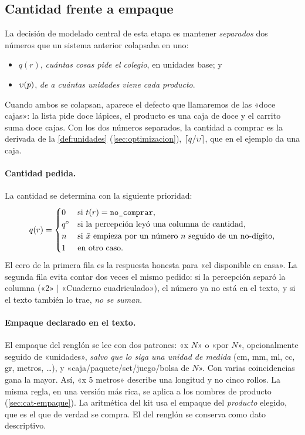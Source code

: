 \subsection{Cantidad frente a empaque}
\label{sec:nor-cantidad}

La decisión de modelado central de esta etapa es mantener \emph{separados} dos
números que un sistema anterior colapsaba en uno:

\begin{itemize}
  \item $q(r)$, \emph{cuántas cosas pide el colegio}, en unidades base; y
  \item $\upsilon(p)$, \emph{de a cuántas unidades viene cada producto}.
\end{itemize}

Cuando ambos se colapsan, aparece el defecto que llamaremos de las «doce
cajas»: la lista pide doce lápices, el producto es una caja de doce y el
carrito suma doce cajas. Con los dos números separados, la cantidad a comprar
es la derivada de la \cref{def:unidades} (\cref{sec:optimizacion}),
$\left\lceil q/\upsilon \right\rceil$, que en el ejemplo da una caja.

\paragraph{Cantidad pedida.} La cantidad se determina con la siguiente
prioridad:
\[
  q(r) = \begin{cases}
    0 & \text{si } t(r)=\texttt{no\_comprar},\\
    q^\circ & \text{si la percepción leyó una columna de cantidad},\\
    n & \text{si } \bar x \text{ empieza por un número } n \text{ seguido de un no-dígito},\\
    1 & \text{en otro caso.}
  \end{cases}
\]
El cero de la primera fila es la respuesta honesta para «el disponible en
casa». La segunda fila evita contar dos veces el mismo pedido: si la
percepción separó la columna («2» $\mid$ «Cuaderno cuadriculado»), el número ya
no está en el texto, y si el texto también lo trae, \emph{no se suman}.

\paragraph{Empaque declarado en el texto.} El empaque del renglón se lee con
dos patrones: «x $N$» o «por $N$», opcionalmente seguido de «unidades»,
\emph{salvo que lo siga una unidad de medida} (cm, mm, ml, cc, gr, metros,
\dots), y «caja/paquete/set/juego/bolsa de $N$». Con varias coincidencias
gana la mayor. Así, «x 5 metros» describe una longitud y no cinco rollos. La
misma regla, en una versión más rica, se aplica a los nombres de producto
(\cref{sec:cat-empaque}). La aritmética del kit usa el empaque del
\emph{producto} elegido, que es el que de verdad se compra. El del renglón se
conserva como dato descriptivo.

